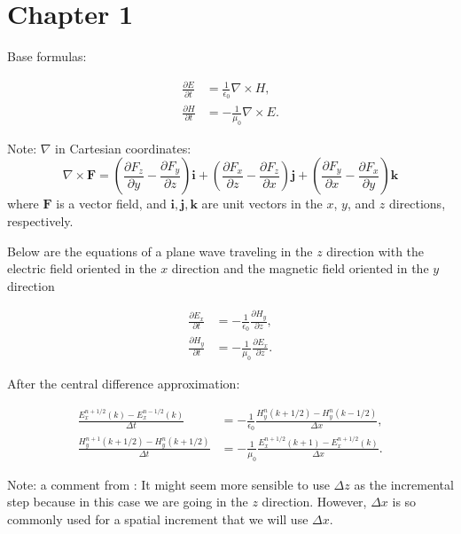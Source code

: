
\section{Chapter 1}

Base formulas:

\[
\begin{aligned}
  \frac{\partial E}{\partial t} &= \frac{1}{\epsilon_0} \nabla \times H, \\
  \frac{\partial H}{\partial t} &= -\frac{1}{\mu_0} \nabla \times E.
\end{aligned}
\]


Note: $\nabla$ in Cartesian coordinates:
\[
\nabla \times \mathbf{F} = \left( \frac{\partial F_z}{\partial y} - \frac{\partial F_y}{\partial
z} \right) \mathbf{i}
+ \left( \frac{\partial F_x}{\partial z} - \frac{\partial F_z}{\partial x} \right) \mathbf{j}
+ \left( \frac{\partial F_y}{\partial x} - \frac{\partial F_x}{\partial y} \right) \mathbf{k}
\]
where \(\mathbf{F}\) is a vector field, and \(\mathbf{i}, \mathbf{j}, \mathbf{k}\) are unit
vectors in the \(x\), \(y\), and \(z\) directions, respectively.

\vsp

Below are the equations of a plane wave traveling in the $z$ direction with the
electric field oriented in the $x$ direction and the magnetic field oriented in the
$y$ direction

\[
\begin{aligned}
\frac{\partial E_x}{\partial t} &= -\frac{1}{\epsilon_0} \frac{\partial H_y}{\partial z}, \\
\frac{\partial H_y}{\partial t} &= -\frac{1}{\mu_0} \frac{\partial E_x}{\partial z}.
\end{aligned}
\]

After the central difference approximation:

\[
\begin{aligned}
\frac{E_x^{n + 1/2}(k) - E_x^{n - 1/2}(k)}{\Delta t} &= -\frac{1}{\epsilon_0} \frac{H_y^n(k + 1/2) - H_y^n(k - 1/2)}{\Delta x}, \\
\frac{H_y^{n + 1}(k + 1/2) - H_y^n(k + 1/2)}{\Delta t} &= -\frac{1}{\mu_0} \frac{E_x^{n + 1/2}(k + 1) - E_x^{n + 1/2}(k)}{\Delta x}.
\end{aligned}
\]

Note: a comment from \cite{houle2019fdtd}: It might seem more sensible to use $\Delta{z}$ as the
incremental step because in this case we are going in the $z$ direction. However, $\Delta{x}$ is so
commonly used for a spatial increment that we will use $\Delta{x}$.

